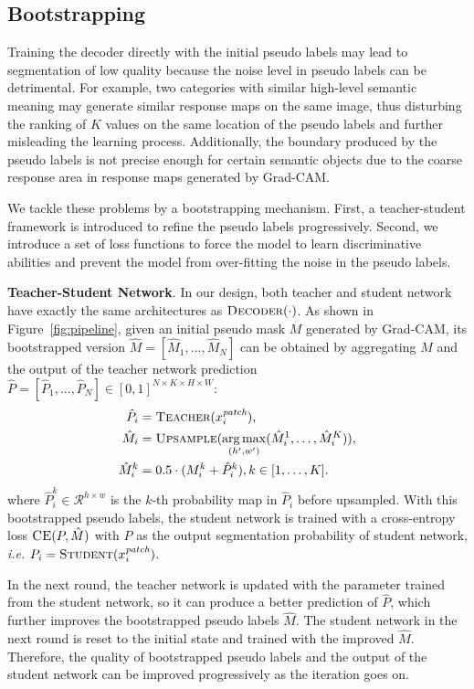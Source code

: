 \documentclass[runningheads]{llncs}
\DeclareMathOperator*{\argmax}{arg\,max}
\def\ie{\emph{i.e. }}
\newcommand{\PAR}[1]{\smallskip \noindent \textbf{#1}}
\begin{document}
\subsection{Bootstrapping}
Training the decoder directly with the initial pseudo labels may lead to segmentation of low quality because the noise level in pseudo labels can be detrimental. For example, two categories with similar high-level semantic meaning may generate similar response maps on the same image, thus disturbing the ranking of $K$ values on the same location of the pseudo labels and further misleading the learning process. Additionally, the boundary produced by the pseudo labels is not precise enough for certain semantic objects due to the coarse response area in response maps generated by Grad-CAM. 

We tackle these problems by a bootstrapping mechanism. First, a teacher-student framework is introduced to refine the pseudo labels progressively. Second, we introduce a set of loss functions to force the model to learn discriminative abilities and prevent the model from over-fitting the noise in the pseudo labels.

\PAR{Teacher-Student Network}. In our design, both teacher and student network have exactly the same architectures as $\Call{Decoder}{\cdot}$. As shown in Figure~\ref{fig:pipeline}, given an initial pseudo mask $M$ generated by Grad-CAM, its bootstrapped version $\hat{M} = [\hat{M}_1, \dots, \hat{M}_N]$ can be obtained by aggregating $M$ and the output of the teacher network prediction $\hat{P} = [\hat{P}_1, ..., \hat{P}_N] \in [0, 1]^{N \times K \times H \times W}$:\begin{align}
    \hat{P}_i &= \Call{Teacher}{x_{i}^{\textit{patch}}}, \\
    \hat{M}_i &= \Call{Upsample}{\argmax_{(h^{\prime}, w^{\prime})}(\hat{M}_i^1, \dots, \hat{M}_i^K)} , \\
    \hat{M}_i^k &= 0.5 \cdot (M_i^k + \hat{P}_i^k), k \in [1, \dots, K].
\end{align}
where $\hat{P}_i^k \in \mathcal{R}^{h \times w}$ is the $k$-th probability map in $\hat{P}_i$ before upsampled. With this bootstrapped pseudo labels, the student network is trained with a cross-entropy loss $\Call{CE}{P, \hat{M}}$ with $P$ as the output segmentation probability of student network, \ie $P_i = \Call{Student}{x_{i}^{\textit{patch}}}$.

In the next round, the teacher network is updated with the parameter trained from the student network, so it can produce a better prediction of $\hat{P}$, which further improves the bootstrapped pseudo labels $\hat{M}$. The student network in the next round is reset to the initial state and trained with the improved $\hat{M}$. Therefore, the quality of bootstrapped pseudo labels and the output of the student network can be improved progressively as the iteration goes on. 
\end{document}
